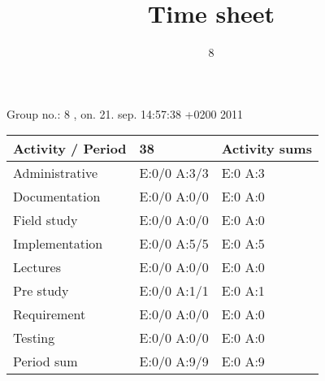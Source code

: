 \documentclass[a4paper]{article}
\title{Time sheet}
\author{8}
\begin{document}
\begin{landscape}
\begin{center}
	Group no.: 8
	, on. 21. sep. 14:57:38 +0200 2011

	\begin{tabular}{| l | l | l |}
		\hline
		Activity / Period & 38 & Activity sums \\
		\hline \hline
		
Administrative & E:0/0 A:3/3 & E:0 A:3 \\
Documentation & E:0/0 A:0/0 & E:0 A:0 \\
Field study & E:0/0 A:0/0 & E:0 A:0 \\
Implementation & E:0/0 A:5/5 & E:0 A:5 \\
Lectures & E:0/0 A:0/0 & E:0 A:0 \\
Pre study & E:0/0 A:1/1 & E:0 A:1 \\
Requirement & E:0/0 A:0/0 & E:0 A:0 \\
Testing & E:0/0 A:0/0 & E:0 A:0 \\
Period sum & E:0/0 A:9/9 & E:0 A:9 \\
		\hline
	\end{tabular}
\end{center}
\end{landscape}
\end{document}
